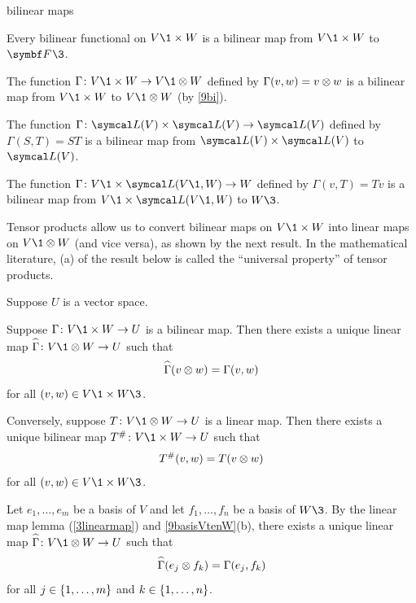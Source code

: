 \begin{example}{bilinear maps}
\begin{Itemize}
\item
Every bilinear functional on $V\1 \times W$ is a bilinear map from $V\1 \times W$ to $\F{}\3$.

\item
The function $\fun \Gamma {V\1 \times W} {V\1 \tensor W}$ defined by $\Gamma(v, w) = v \otimes w$ is a bilinear map from
$V\1 \times W$ to $V\1 \tensor W$ (by \ref{9bi}).

\item
The function $\fun \Gamma {\L(V) \times \L(V)} {\L(V)}$ defined by $\Gamma(S, T) = ST$ is a bilinear map from $\L(V) \times \L(V)$ to $\L(V)$.

\item
The function $\fun \Gamma {V\1 \times \L(V\1, W)} W$ defined by $\Gamma(v, T) = Tv$ is a bilinear map from $V\1 \times \L(V\1, W)$ to $W\3$.
\end{Itemize}
\exampleitemend
\end{example}

\pagebreak[3]

Tensor products allow us to convert bilinear maps on $V\1 \times W$ into linear maps on $V\1 \tensor W$ (and vice versa), as shown by the next result. In the mathematical literature, (a) of the result below is called the ``universal property'' of tensor products.

{Suppose $U$ is a vector space.
\begin{subtheorem}
\item
Suppose $\fun \Gamma {V\1 \times W} U$ is a bilinear map. Then there exists a unique linear map
$\fun {\hat[8]{\Gamma}} {V\1 \tensor W} U$ such that
\[
\hat[8]{\Gamma}(v \tensor w) = \Gamma(v, w)
\]
for all $(v, w) \in V\1 \times W\3$.
\item
Conversely, suppose $\fun T {V\1 \tensor W} U$ is a linear map. Then there exists a unique bilinear map
$\fun {\pound{T}} {V\1 \times W} U$ such that
\[
{T}^{\#}(v, w) = T(v \otimes w)
\]
for all $(v, w) \in V\1 \times W\3$.
\end{subtheorem}}

\proof
Let $e_1, \ldots, e_m$ be a basis of $V$ and let $f_1, \ldots, f_n$ be a basis of $W\3$. By the linear map lemma (\ref{3linearmap}) and \ref{9basisVtenW}(b), there exists a unique linear map $\fun {\hat[8]{\Gamma}} {V\1 \tensor W} U$ such that
\[
\hat[8]{\Gamma}(e_j \tensor f_k) = \Gamma(e_j, f_k)
\]
for all $j \in \{1, \ldots, m\}$ and $k \in \{1, \ldots, n\}$.

